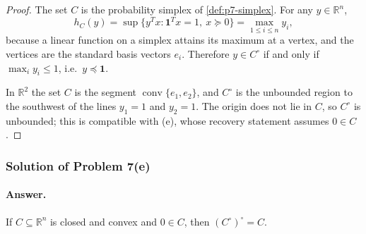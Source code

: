 \documentclass[11pt,a4paper]{article}
\begin{document}
\begin{proof}
The set \(C\) is the probability simplex of \cref{def:p7-simplex}. For any \(y\in\mathbb{R}^{n}\),
\[
h_{C}(y)
=
\sup\bigl\{ y^{T}x : \mathbf{1}^{T}x=1,\ x\succeq 0 \bigr\}
=
\max_{1\le i\le n} y_{i},
\]
because a linear function on a simplex attains its maximum at a vertex, and the vertices are the standard basis vectors \(e_{i}\). Therefore \(y\in C^{\circ}\) if and only if \(\max_{i}y_{i}\le 1\), i.e.\ \(y\preceq\mathbf{1}\).

In \(\mathbb{R}^{2}\) the set \(C\) is the segment \(\operatorname{conv}\{e_{1},e_{2}\}\), and \(C^{\circ}\) is the unbounded region to the southwest of the lines \(y_{1}=1\) and \(y_{2}=1\). The origin does not lie in \(C\), so \(C^{\circ}\) is unbounded; this is compatible with (e), whose recovery statement assumes \(0\in C\).
\end{proof}

\begin{center}
\end{center}

\subsubsection{Solution of Problem 7(e)}

\paragraph{Answer.}
If \(C\subseteq\mathbb{R}^{n}\) is closed and convex and \(0\in C\), then \((C^{\circ})^{\circ}=C\).
\end{document}
